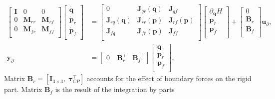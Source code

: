 \documentclass{svjour3}                     %
\begin{document}
	\begin{equation}
	\label{eq:EB_sys}
	\begin{aligned}
	\begin{bmatrix}
	\mathbf{I} & 0 & 0 \\
	0 & \mathbf{M}_{rr} & \mathbf{M}_{rf}\\ 
	0 & \mathbf{M}_{fr} & \mathbf{M}_{ff}\\
	\end{bmatrix} 
	\begin{bmatrix}
	\dot{\mathbf{q}} \\ 
	\dot{\mathbf{p}}_{r} \\ 
	\dot{\mathbf{p}}_{f} \\ 
	\end{bmatrix} &= 
	\begin{bmatrix}
	0 & \mathbf{J}_{qr}(\mathbf{q}) & \mathbf{J}_{qf} \\
	\mathbf{J}_{rq}(\mathbf{q}) & \mathbf{J}_{rr}(\mathbf{p}) & \mathbf{J}_{rf}(\mathbf{p})\\ 
	\mathbf{J}_{fq} & \mathbf{J}_{fr}(\mathbf{p}) & \mathbf{J}_{ff}\\
	\end{bmatrix}  
	\begin{bmatrix}
	\partial_{\mathbf{q}} H \\
	{\mathbf{p}}_{r} \\ 
	{\mathbf{p}}_{f} \\ 
	\end{bmatrix} + 
	\begin{bmatrix}
	0 \\
	\mathbf{B}_{r} \\ 
	\mathbf{B}_{f} \\ 
	\end{bmatrix}
	\mathbf{u}_\partial, \\
	\mathbf{y}_\partial &= \begin{bmatrix}
	0 \ & \mathbf{B}_{r}^\top & \mathbf{B}_{f}^\top  
	\end{bmatrix} \begin{bmatrix}
	\mathbf{q} \\
	{\mathbf{p}}_{r} \\ 
	{\mathbf{p}}_{f} \\ 
	\end{bmatrix},
	\end{aligned}
	\end{equation}
	Matrix $\mathbf{B}_{r} = [\mathbf{I}_{3\times 3}, \; \bm\tau_{CP}^\top]$ accounts for the effect of boundary forces on the rigid part. Matrix $\mathbf{B}_{f}$  is the result of the integration by parts
\end{document}
